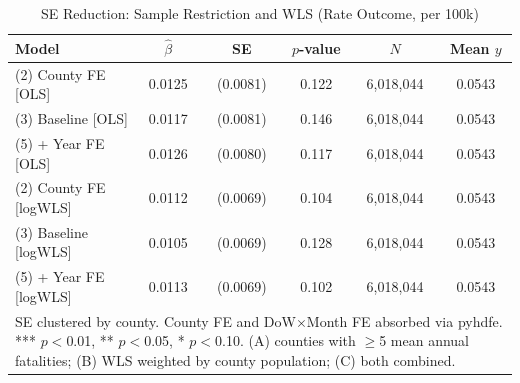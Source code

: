 \begin{table}[htbp]\centering
\caption{SE Reduction: Sample Restriction and WLS (Rate Outcome, per 100k)}
\begin{tabular}{lccccc}
\hline\hline
Model & $\hat\beta$ & SE & $p$-value & $N$ & Mean $y$ \\
\midrule
(2) County FE [OLS] & 0.0125 & (0.0081) & 0.122 & 6,018,044 & 0.0543 \\
(3) Baseline [OLS] & 0.0117 & (0.0081) & 0.146 & 6,018,044 & 0.0543 \\
(5) + Year FE [OLS] & 0.0126 & (0.0080) & 0.117 & 6,018,044 & 0.0543 \\
(2) County FE [logWLS] & 0.0112 & (0.0069) & 0.104 & 6,018,044 & 0.0543 \\
(3) Baseline [logWLS] & 0.0105 & (0.0069) & 0.128 & 6,018,044 & 0.0543 \\
(5) + Year FE [logWLS] & 0.0113 & (0.0069) & 0.102 & 6,018,044 & 0.0543 \\
\hline\hline
\multicolumn{6}{p{0.9\textwidth}}{\footnotesize SE clustered by county. County FE and DoW$\times$Month FE absorbed via pyhdfe. *** $p{<}$0.01, ** $p{<}$0.05, * $p{<}$0.10. (A) counties with $\geq$5 mean annual fatalities; (B) WLS weighted by county population; (C) both combined.} \\
\end{tabular}
\end{table}